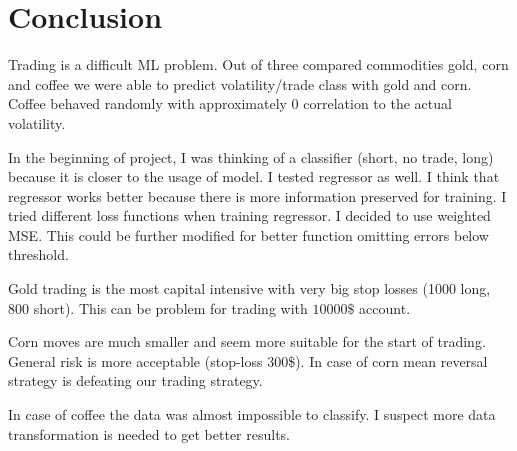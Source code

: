 \documentclass[final,2p]{elsarticle}
\begin{document}

\section{Conclusion}

Trading is a difficult ML problem. Out of three compared commodities gold, corn and coffee we were able to predict volatility/trade class with gold and corn. Coffee behaved randomly with approximately 0 correlation to the actual volatility.

In the beginning of project, I was thinking of a classifier (short, no trade, long) because it is closer to the usage of model. I tested regressor as well. I think that regressor works better because there is more information preserved for training. I tried different loss functions when training regressor. I decided to use weighted MSE. This could be further modified for better function omitting errors below threshold.

Gold trading is the most capital intensive with very big stop losses (1000 long, 800 short). This can be problem for trading with $10 000\$$ account.

Corn moves are much smaller and seem more suitable for the start of trading. General risk is more acceptable (stop-loss 300\$). In case of corn mean reversal strategy is defeating our trading strategy.

In case of coffee the data was almost impossible to classify. I suspect more data transformation is needed to get better results.
\end{document}
